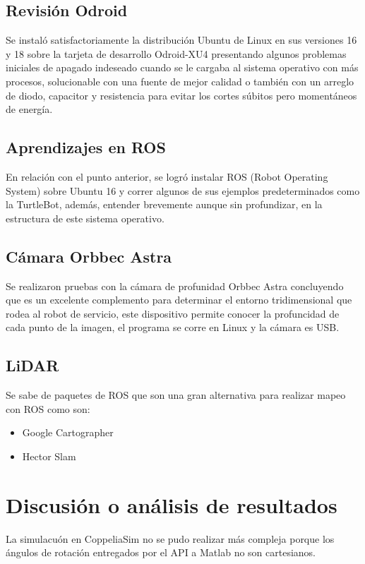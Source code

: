 \documentclass[conference]{IEEEtran}
\begin{document}
\subsection{Revisión Odroid}
Se instaló satisfactoriamente la distribución Ubuntu de Linux en sus versiones 16 y 18
sobre la tarjeta de desarrollo Odroid-XU4 presentando algunos problemas iniciales de
apagado indeseado cuando se le cargaba al sistema operativo con más procesos,
solucionable con una fuente de mejor calidad o también con un arreglo de diodo, capacitor
y resistencia para evitar los cortes súbitos pero momentáneos de energía.

\subsection{Aprendizajes en ROS}
En relación con el punto anterior, se logró instalar ROS (Robot Operating System)
sobre Ubuntu 16 y correr algunos de sus ejemplos predeterminados como la TurtleBot,
además, entender brevemente aunque sin profundizar, en la estructura de este sistema operativo.

\subsection{Cámara Orbbec Astra}
Se realizaron pruebas con la cámara de profunidad Orbbec Astra concluyendo que
es un excelente complemento para determinar el entorno tridimensional que rodea
al robot de servicio, este dispositivo permite conocer la profuncidad de cada punto
de la imagen, el programa se corre en Linux y la cámara es USB.

\subsection{LiDAR}
Se sabe de paquetes de ROS que son una gran alternativa para realizar mapeo con ROS como son:
\begin{itemize}
  \item Google Cartographer
  \item Hector Slam
\end{itemize}

\section{Discusión o análisis de resultados}
La simulacuón en CoppeliaSim no se pudo realizar más compleja porque los ángulos de rotación
entregados por el API a Matlab no son cartesianos.
\end{document}
